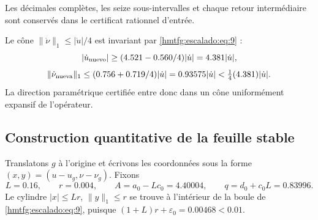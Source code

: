 Les décimales complètes, les seize sous-intervalles et chaque retour intermédiaire sont conservés dans le certificat rationnel d’entrée.

Le cône \(\|\dot\nu\|_1\le|\dot u|/4\) est invariant par \eqref{hmtfg:escalado:eq:9} :
\[
|\dot u_{\rm nuevo}|\ge(4.521-0.560/4)|\dot u|
=4.381|\dot u|,
\]
\begin{equation}
\|\dot\nu_{\rm nueva}\|_1\le(0.756+0.719/4)|\dot u|
=0.93575|\dot u|<\tfrac14(4.381)|\dot u|.
\label{hmtfg:escalado:eq:11}
\end{equation}
La direction paramétrique certifiée entre donc dans un cône uniformément expansif de l’opérateur.


\subsection{Construction quantitative de la feuille stable}
\label{hmtfg:escalado:5}

Translatons \(g\) à l’origine et écrivons les coordonnées sous la forme \((x,y)=(u-u_g,\nu-\nu_g)\). Fixons
\begin{equation}
L=0.16,\qquad r=0.004,\qquad
A=a_0-Lc_0=4.40004,\qquad q=d_0+c_0L=0.83996.
\label{hmtfg:escalado:eq:12}
\end{equation}
Le cylindre \(|x|\le Lr\), \(\|y\|_1\le r\) se trouve à l’intérieur de la boule de \eqref{hmtfg:escalado:eq:9}, puisque
\((1+L)r+\varepsilon_0=0.00468<0.01\).

